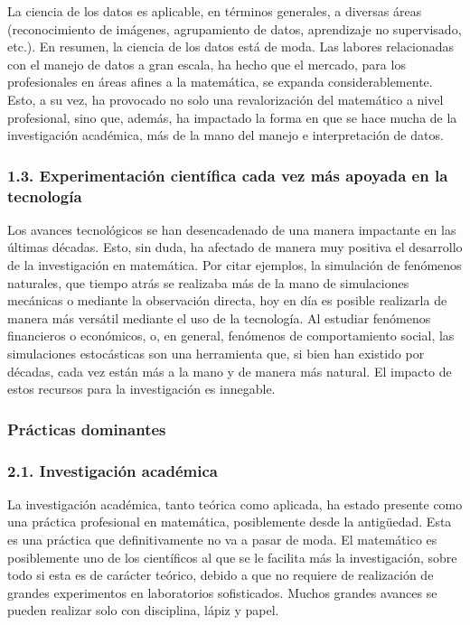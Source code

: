 La ciencia de los datos es aplicable, en términos generales, a diversas áreas (reconocimiento de imágenes, agrupamiento de datos, aprendizaje no supervisado, etc.). En resumen, la ciencia de
los datos está de moda. Las labores relacionadas con el manejo de datos a gran escala, ha hecho que el mercado, para los profesionales en áreas afines a la matemática, se expanda considerablemente. Esto, a su vez, ha provocado no solo una revalorización del matemático a nivel profesional, sino que, además, ha impactado la forma en que se hace mucha de la investigación académica, más de la mano del manejo e interpretación de datos. 

\subsubsection*{1.3. Experimentación científica cada vez más apoyada en la tecnología}

Los avances tecnológicos se han desencadenado de una manera impactante en las últimas décadas. Esto, sin duda, ha afectado de manera muy positiva el desarrollo de la investigación en matemática. Por citar ejemplos, la simulación de fenómenos naturales, que tiempo atrás se realizaba más de la mano de simulaciones mecánicas o mediante la observación directa, hoy en día es posible realizarla de manera más versátil mediante el uso de la tecnología. Al estudiar fenómenos financieros o económicos, o, en general, fenómenos de comportamiento social, las simulaciones estocásticas son una herramienta que, si bien han existido por décadas, cada vez están más a la mano y de manera más natural. El impacto de estos recursos para la investigación es innegable. 

\subsubsection{Prácticas dominantes}

\subsubsection*{ 2.1. Investigación académica}

La investigación académica, tanto teórica como aplicada, ha estado presente como una práctica profesional en matemática, posiblemente desde la antigüedad. Esta es una práctica que definitivamente no va a pasar de moda. El matemático es posiblemente uno de los científicos al que se le facilita más la investigación, sobre todo si esta es de carácter teórico, debido a que no requiere de realización de grandes experimentos en laboratorios sofisticados. Muchos grandes avances se pueden realizar solo con disciplina, lápiz y papel. 


